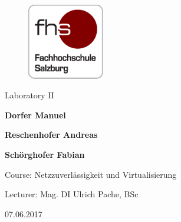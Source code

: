 
\begin{titlepage}

\hspace{7cm}

\begin{figure}[!ht]
	\centering
	\includegraphics[width=0.3\textwidth]{fhs_logo_web.png}
\end{figure}

\begin{center}
	\vspace{2cm}
	\Huge Laboratory II
	\vspace{3cm}
	
	\Large{\bf\large Dorfer Manuel}	
	
	\Large{\bf\large Reschenhofer Andreas}
	
	\Large{\bf\large Schörghofer Fabian}
	\vspace{3cm}

	\large Course: Netzzuverlässigkeit und Virtualisierung 
	
	\large Lecturer: Mag. DI Ulrich Pache, BSc 
	
	\large 07.06.2017
\end{center}

\end{titlepage}